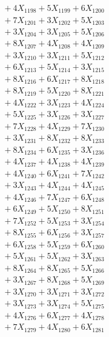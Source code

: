 \documentclass[a4paper,10pt]{article}
\begin{document}
{\begin{align}
&\;  + 4 X_{1198} + 5 X_{1199} + 6 X_{1200} \\[0.3ex]
&\;  + 7 X_{1201} + 3 X_{1202} + 5 X_{1203} \\[0.3ex]
&\;  + 3 X_{1204} + 3 X_{1205} + 5 X_{1206} \\[0.3ex]
&\;  + 8 X_{1207} + 4 X_{1208} + 4 X_{1209} \\[0.5ex]\allowbreak
&\;  + 3 X_{1210} + 3 X_{1211} + 5 X_{1212} \\[0.3ex]
&\;  + 6 X_{1213} + 5 X_{1214} + 3 X_{1215} \\[0.3ex]
&\;  + 8 X_{1216} + 6 X_{1217} + 8 X_{1218} \\[0.3ex]
&\;  + 8 X_{1219} + 5 X_{1220} + 8 X_{1221} \\[0.3ex]
&\;  + 4 X_{1222} + 3 X_{1223} + 4 X_{1224} \\[0.3ex]
&\;  + 5 X_{1225} + 3 X_{1226} + 3 X_{1227} \\[0.3ex]
&\;  + 7 X_{1228} + 4 X_{1229} + 7 X_{1230} \\[0.3ex]
&\;  + 3 X_{1231} + 8 X_{1232} + 8 X_{1233} \\[0.3ex]
&\;  + 8 X_{1234} + 6 X_{1235} + 3 X_{1236} \\[0.3ex]
&\;  + 4 X_{1237} + 4 X_{1238} + 4 X_{1239} \\[0.5ex]\allowbreak
&\;  + 4 X_{1240} + 6 X_{1241} + 7 X_{1242} \\[0.3ex]
&\;  + 3 X_{1243} + 4 X_{1244} + 4 X_{1245} \\[0.3ex]
&\;  + 4 X_{1246} + 7 X_{1247} + 6 X_{1248} \\[0.3ex]
&\;  + 6 X_{1249} + 5 X_{1250} + 8 X_{1251} \\[0.3ex]
&\;  + 7 X_{1252} + 5 X_{1253} + 3 X_{1254} \\[0.3ex]
&\;  + 8 X_{1255} + 6 X_{1256} + 3 X_{1257} \\[0.3ex]
&\;  + 6 X_{1258} + 5 X_{1259} + 6 X_{1260} \\[0.3ex]
&\;  + 5 X_{1261} + 5 X_{1262} + 3 X_{1263} \\[0.3ex]
&\;  + 8 X_{1264} + 8 X_{1265} + 5 X_{1266} \\[0.3ex]
&\;  + 3 X_{1267} + 8 X_{1268} + 5 X_{1269} \\[0.5ex]\allowbreak
&\;  + 3 X_{1270} + 3 X_{1271} + 3 X_{1272} \\[0.3ex]
&\;  + 3 X_{1273} + 3 X_{1274} + 5 X_{1275} \\[0.3ex]
&\;  + 4 X_{1276} + 6 X_{1277} + 4 X_{1278} \\[0.3ex]
&\;  + 7 X_{1279} + 4 X_{1280} + 6 X_{1281} \\[0.3ex]

\end{align}}
\end{document}
